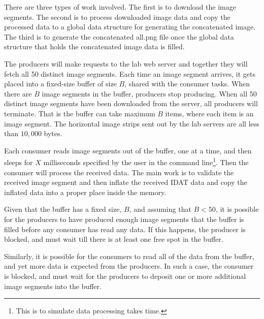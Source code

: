 There are three types of work involved. The first  is to download the image segments. The second is to process downloaded image data and copy the processed data to a global data structure for generating the concatenated image. The third is to generate the concatenated all.png file once the global data structure that holds the concatenated image data is filled.

The producers will make requests to the lab web server and together they will fetch all 50 distinct image segments. Each time an image segment arrives, it gets placed into a fixed-size buffer of size $B$, 
shared with the consumer tasks. When there are $B$ image segments in the buffer, producers stop producing. When all 50 distinct image segments have been downloaded from the server, all producers will terminate. That is the buffer can take maximum $B$ items, where each item is an image segment. The horizontal image strips sent out by the lab servers are all less than $10,000$ bytes. 

Each consumer reads image segments out of the buffer, one at a time, and then sleeps for $X$ milliseconds specified by the user in the command line\footnote{This is to simulate data processing takes time.}. Then the consumer will process the received data. The main work is to validate the received image segment and then inflate the received IDAT data and copy the inflated data into a proper place inside the memory. 

Given that the buffer has a fixed size, $B$, and assuming that $B < 50$, it is possible for the producers to have produced enough image segments that the buffer is filled before any consumer has read any data.  If this happens, the producer is blocked, and must wait till there is at least one free spot in the buffer.  

Similarly, it is possible for the consumers to read all of the data from the buffer, and yet more data is expected from the producers.  In such a case, the consumer is blocked, and must wait for the producers to deposit one or more additional image segments into the buffer.  

